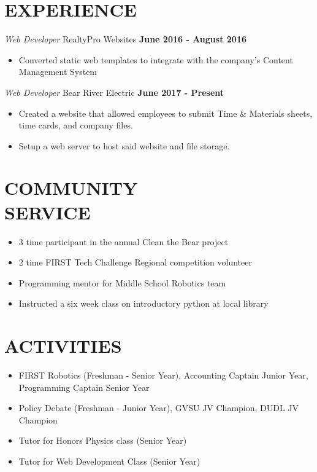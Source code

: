 \documentclass[margin, line]{res}
\begin{document}
\begin{resume}
  \section{EXPERIENCE}
    {\sl Web Developer} \hfill RealtyPro Websites \hfill \textbf{June 2016
    - August 2016} \\
  \begin{itemize}
    \item Converted static web templates to integrate with the company's
      Content Management System
  \end{itemize}

    {\sl Web Developer} \hfill Bear River Electric \hfill \textbf{June 2017
    - Present} \\
  \begin{itemize}
    \item Created a website that allowed employees to submit Time \& Materials sheets,
      time cards, and company files.

    \item Setup a web server to host said website and file storage.

  \end{itemize}

\section{COMMUNITY \\ SERVICE}
    \begin{itemize}
      \item 3 time participant in the annual Clean the Bear project
      \item 2 time FIRST Tech Challenge Regional competition volunteer
      \item Programming mentor for Middle School Robotics team
      \item Instructed a six week class on introductory python at local library
    \end{itemize}

\section{ACTIVITIES}
\begin{itemize}
  \item FIRST Robotics (Freshman - Senior Year), Accounting Captain Junior Year, Programming Captain Senior Year
  \item Policy Debate (Freshman - Junior Year), GVSU JV Champion, DUDL JV Champion
  \item Tutor for Honors Physics class (Senior Year)
  \item Tutor for Web Development Class (Senior Year)
\end{itemize}
\end{resume}
\end{document}
